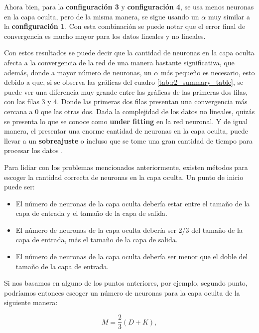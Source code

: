 \documentclass{article}
\begin{document}
Ahora bien, para la \textbf{configuración 3} y \textbf{configuración 4}, se usa menos neuronas en la capa oculta, pero de la misma manera, se sigue usando un $\alpha$ muy similar a la \textbf{configuración 1}. Con esta combinación se puede notar que el error final de convergencia es mucho mayor para los datos lineales y no lineales. 

Con estos resultados se puede decir que la cantidad de neuronas en la capa oculta afecta a la convergencia de la red de una manera bastante significativa, que además, donde a mayor número de neuronas, un $\alpha$ más pequeño es necesario, esto debido a que, si se observa las gráficas del cuadro \ref{tab:r2_summary_table}, se puede ver una diferencia muy grande entre las gráficas de las primeras dos filas, con las filas 3 y 4. Donde las primeras dos filas presentan una convergencia más cercana a 0 que las otras dos. Dada la complejidad de los datos no lineales, quizás se presenta lo que se conoce como \textbf{under fitting} \cite{panchal2011behaviour} en la red neuronal. Y de igual manera, el presentar una enorme cantidad de neuronas en la capa oculta, puede llevar a un \textbf{sobreajuste} o incluso que se tome una gran cantidad de tiempo para procesar los datos \cite{panchal2011behaviour}. 

Para lidiar con los problemas mencionados anteriormente, existen métodos para escoger la cantidad correcta de neuronas en la capa oculta. Un punto de inicio puede ser:
\begin{itemize}
    \item El número de neuronas de la capa oculta debería estar entre el tamaño de la capa de entrada y el tamaño de la capa de salida.
    
    \item El número de neuronas de la capa oculta debería ser 2/3 del tamaño de la capa de entrada, más el tamaño de la capa de salida.
    
    \item  El número de neuronas de la capa oculta debería ser menor que el doble del tamaño de la capa de entrada. \cite{panchal2011behaviour}
\end{itemize}

Si nos basamos en alguno de los puntos anteriores, por ejemplo, segundo punto, podríamos entonces escoger un número de neuronas para la capa oculta de la siguiente manera:

\begin{equation*}
    M = \frac{2}{3} (D+K),
\end{equation*}
\end{document}
